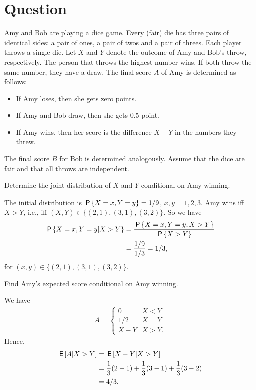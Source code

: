 \section*{Question}


Amy and Bob are playing a dice game. Every (fair) die has three pairs of identical sides: a pair of ones, a pair of twos and a pair of threes. Each player throws a single die. Let $X$ and $Y$ denote the outcome of Amy and Bob's throw, respectively. The person that throws the highest number wins. If both throw the same number, they have a draw. The final score $A$ of Amy is determined as follows:
\begin{itemize}
    \item If Amy loses, then she gets zero points.
    \item If Amy and Bob draw, then she gets 0.5 point.
    \item If Amy wins, then her score is the difference $X -Y$ in the numbers they threw.
\end{itemize}
The final score $B$ for Bob is determined analogously. Assume that the dice are fair and that all throws are independent.

\begin{exercise}[1]
Determine the joint distribution of $X$ and $Y$ conditional on Amy winning.
\begin{solution}
The initial distribution is $\P{X = x, Y = y} = 1/9$, $x,y = 1,2,3$. Amy wins iff $X>Y$, i.e., iff $(X,Y) \in \{(2,1), (3,1), (3,2)\}$. So we have
\begin{align}
    \P{X=x,Y=y | X>Y} &= \frac{\P{X=x,Y=y,X>Y}}{\P{X>Y}} \\
    &= \frac{1/9}{1/3} = 1/3,
\end{align}
for $(x,y) \in \{(2,1), (3,1), (3,2)\}$.
\end{solution}
\end{exercise}

\begin{exercise}[1.5]
Find Amy's expected score conditional on Amy winning.
\begin{solution}
We have
\begin{align}
    A = \begin{cases}
    0 &X < Y \\
    1/2 &X = Y \\
    X - Y &X > Y.
    \end{cases}
\end{align}
Hence,
\begin{align}
    \E{A|X>Y} &= \E{X-Y|X>Y} \\
    &= \frac{1}{3} (2-1) + \frac{1}{3} (3-1) + \frac{1}{3} (3-2) \\
    &= 4/3.
\end{align}
\end{solution}
\end{exercise}

